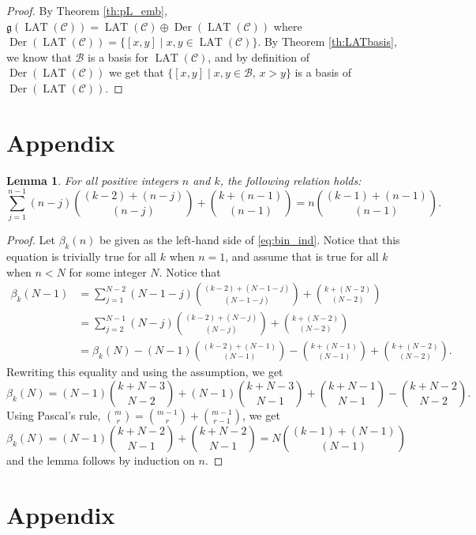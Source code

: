 \documentclass[10pt,a4paper]{amsart}
\newcommand{\Der}{\operatorname{Der}}
\newcommand*{\LAT}{\operatorname{LAT}}
\numberwithin{equation}{section}
\newtheorem{Lemma}[Theorem]{Lemma}
\begin{document}
\begin{proof}
 By Theorem \ref{th:pL_emb}, $\mathfrak{g}(\LAT(\mathcal{C})) = \LAT(\mathcal{C}) \oplus \Der(\LAT(\mathcal{C}))$ where $\Der(\LAT(\mathcal{C})) = \{ [x,y] \mid x,y \in \LAT(\mathcal{C}) \}$. By Theorem \ref{th:LATbasis}, we know that $\mathcal{B}$ is a basis for $\LAT(\mathcal{C})$, and by definition of $\Der(\LAT(\mathcal{C}))$ we get that $\{[x,y] \mid x,y \in \mathcal{B}, \, x>y \}$ is a basis of $\Der(\LAT(\mathcal{C}))$.
\end{proof}

\appendix

\section{Appendix}

\begin{Lemma}\label{lemma:bin_ind}
 For all positive integers $n$ and $k$, the following relation holds:
 \begin{equation}\label{eq:bin_ind}
 \sum_{j=1}^{n-1}(n-j)\binom{(k-2) + (n-j)}{(n-j)} + \binom{k + (n-1)}{(n-1)} = n\binom{(k-1)+(n-1)}{(n-1)}.
 \end{equation}
\end{Lemma}

\begin{proof}
 Let $\beta_k(n)$ be given as the left-hand side of \eqref{eq:bin_ind}. Notice that this equation is trivially true for all $k$ when $n=1$, and assume that is true for all $k$ when $n<N$ for some integer $N$. Notice that
 \begin{align*}
 \beta_k(N-1) &= \sum_{j=1}^{N-2}(N-1-j)\binom{(k-2) + (N-1-j)}{(N-1-j)} + \binom{k + (N-2)}{(N-2)} \\
 &= \sum_{j=2}^{N-1}(N-j)\binom{(k-2) + (N-j)}{(N-j)} + \binom{k + (N-2)}{(N-2)} \\
 &= \beta_k(N) - (N-1)\binom{(k-2)+(N-1)}{(N-1)} - \binom{k + (N-1)}{(N-1)} +\binom{k + (N-2)}{(N-2)}.
 \end{align*}
 Rewriting this equality and using the assumption, we get
 \[
 \beta_k(N) = (N-1)\binom{k +N-3}{N-2} + (N-1)\binom{k +N-3}{N-1} + \binom{k+N-1}{N-1} - \binom{k +N-2}{N-2}.
 \]
 Using Pascal's rule, $\binom{m}{r}= \binom{m-1}{r} + \binom{m-1}{r-1}$, we get
 \[
 \beta_k(N) = (N-1)\binom{k+N-2}{N-1} + \binom{k+N-2}{N-1} = N\binom{(k-1) + (N-1)}{(N-1)}
 \]
 and the lemma follows by induction on $n$.
\end{proof}

\section{Appendix}
\end{document}
